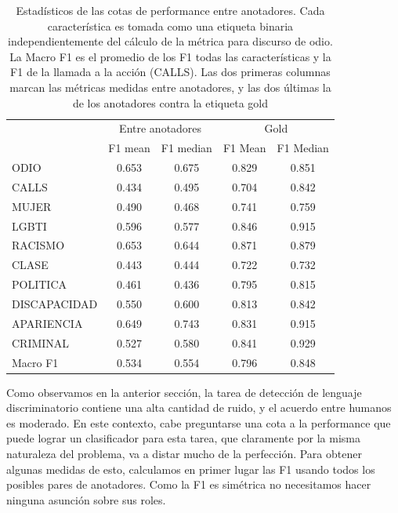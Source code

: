 \begin{table}
    \centering
    \begin{tabular}{l cc  cc}
                   & \multicolumn{2}{c}{Entre anotadores} & \multicolumn{2}{c}{Gold} \\
        {}         &  F1 mean&  F1 median  & F1 Mean  &  F1 Median \\
        \hline
        ODIO       &  0.653 &   0.675    & 0.829   &   0.851   \\
        CALLS      &  0.434 &   0.495   &  0.704   &   0.842  \\
        \hline
        MUJER      &  0.490 &   0.468   &  0.741   &   0.759  \\
        LGBTI      &  0.596 &   0.577   &  0.846   &   0.915  \\
        RACISMO    &  0.653 &   0.644   &  0.871   &   0.879  \\
        CLASE      &  0.443 &   0.444   &  0.722   &   0.732  \\
        POLITICA   &  0.461 &   0.436   &  0.795   &   0.815  \\
        DISCAPACIDAD& 0.550 &   0.600   &  0.813   &   0.842  \\
        APARIENCIA &  0.649 &   0.743   &  0.831   &   0.915  \\
        CRIMINAL   &  0.527 &   0.580   &  0.841   &   0.929  \\
        \hline
        Macro F1   &  0.534 &   0.554   &  0.796   &   0.848  \\
        \hline
    \end{tabular}

    \caption{Estadísticos de las cotas de performance entre anotadores. Cada característica es tomada como una etiqueta binaria independientemente del cálculo de la métrica para discurso de odio. La Macro F1 es el promedio de los F1 todas las características y la F1 de la llamada a la acción (CALLS). Las dos primeras columnas marcan las métricas medidas entre anotadores, y las dos últimas la de los anotadores contra la etiqueta gold}
    \label{tab:ia_f1_scores}
\end{table}


Como observamos en la anterior sección, la tarea de detección de lenguaje discriminatorio contiene una alta cantidad de ruido, y el acuerdo entre humanos es moderado. En este contexto, cabe preguntarse una cota a la performance que puede lograr un clasificador para esta tarea, que claramente por la misma naturaleza del problema, va a distar mucho de la perfección. Para obtener algunas medidas de esto, calculamos en primer lugar las F1 usando todos los posibles pares de anotadores. Como la F1 es simétrica no necesitamos hacer ninguna asunción sobre sus roles.

